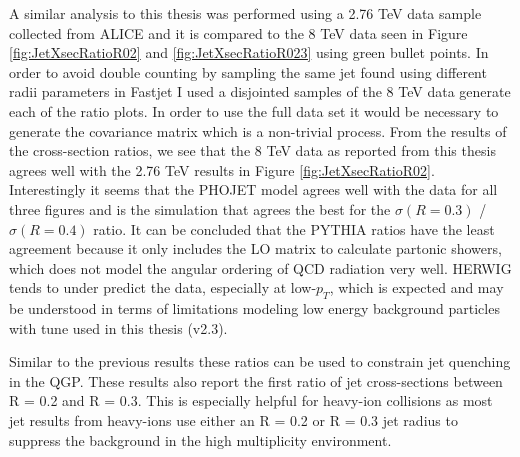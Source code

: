 

A similar analysis to this thesis was performed using a 2.76 TeV  data sample collected from ALICE\cite{MA2013319} and it is compared to the 8 TeV data seen in Figure \ref{fig:JetXsecRatioR02} and \ref{fig:JetXsecRatioR023} using green bullet points.  
In order to avoid double counting by sampling the same jet found using different radii parameters in Fastjet I used a disjointed samples of the 8 TeV data generate each of the ratio plots.  In order to use the full data set it would be necessary to generate the covariance matrix which is a non-trivial process.   From the results of the cross-section ratios, we see that the 8 TeV data as reported from this thesis agrees well with the 2.76 TeV results in Figure \ref{fig:JetXsecRatioR02}.  Interestingly it seems that the PHOJET model agrees well with the data for all three figures and is the simulation that agrees the best for the $\sigma (R = 0.3)$ / $\sigma (R = 0.4)$ ratio.  It can be concluded that the PYTHIA ratios have the least agreement because it only includes the LO matrix to calculate partonic showers, which does not model the angular ordering of QCD radiation very well.  HERWIG tends to under predict the data, especially at low-$p_{T}$, which is expected and may be understood in terms of limitations modeling low energy background particles with tune used in this thesis (v2.3).  

Similar to the previous results these ratios can be used to constrain jet quenching in the QGP.  These results also report the first ratio of jet cross-sections between R = 0.2 and R = 0.3.  This is especially helpful for heavy-ion collisions as most jet results from heavy-ions use either an R = 0.2 or R = 0.3 jet radius to suppress the background in the high multiplicity environment.


